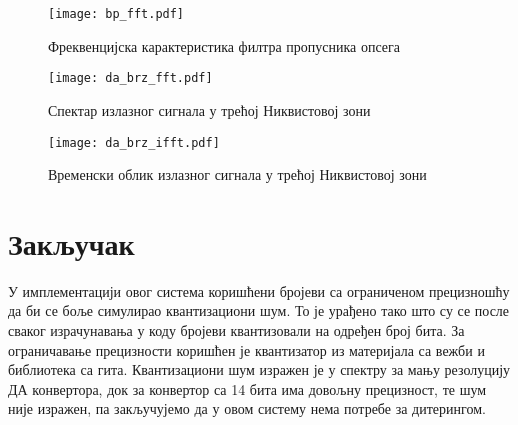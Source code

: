 \documentclass[conference]{IEEEJERM}
\begin{document}
\begin{figure}[t]
	\centering
	\texttt{[image: bp\_fft.pdf]}
	\caption{Фреквенцијска карактеристика филтра пропусника опсега}
	\label{fig:bp_fft}
\end{figure}

\begin{figure}[t]
	\centering
	\texttt{[image: da\_brz\_fft.pdf]}
	\caption{Спектар излазног сигнала у трећој Никвистовој зони}
	\label{fig:da_brz_fft}
\end{figure}

\begin{figure}[t]
	\centering
	\texttt{[image: da\_brz\_ifft.pdf]}
	\caption{Временски облик излазног сигнала у трећој Никвистовој зони}
	\label{fig:da_brz_ifft}
\end{figure}



\section{Закључак}


У имплементацији овог система коришћени бројеви са ограниченом прецизношћу да би се боље симулирао квантизациони шум.
То је урађено тако што су се после сваког израчунавања у коду бројеви квантизовали на одређен број бита.
За ограничавање прецизности коришћен је квантизатор из материјала са вежби и библиотека са гита.
Квантизациони шум изражен је у спектру за мању резолуцију ДА конвертора, док за конвертор са 14 бита има довољну прецизност, те шум није изражен,
па закључујемо да у овом систему нема потребе за дитерингом. 
\end{document}
